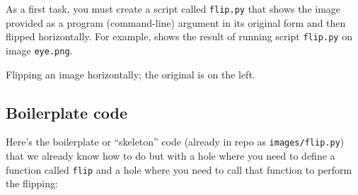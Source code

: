 As a first task, you must create a script called {\tt flip.py} that shows the image provided as a program (command-line) argument in its original form and then flipped horizontally.  For example,  shows the result of running script {\tt flip.py} on image {\tt eye.png}.

\begin{marginfigure}
\begin{center}
 
\end{center}
\caption{Flipping an image horizontally; the original is on the left.}
\label{flipped}
\end{marginfigure}

\subsection{Boilerplate code}

Here's the boilerplate or ``skeleton'' code (already in repo as {\tt images/flip.py}) that we already know how to do but with a hole where you need to define a function called {\tt flip} and a hole where you need to call that function to perform the flipping:


